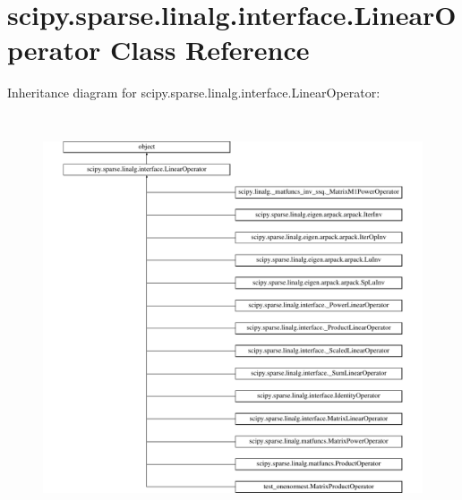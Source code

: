\hypertarget{classscipy_1_1sparse_1_1linalg_1_1interface_1_1LinearOperator}{}\section{scipy.\+sparse.\+linalg.\+interface.\+Linear\+Operator Class Reference}
\label{classscipy_1_1sparse_1_1linalg_1_1interface_1_1LinearOperator}
Inheritance diagram for scipy.\+sparse.\+linalg.\+interface.\+Linear\+Operator\+:\begin{figure}[H]
\begin{center}
\leavevmode
\includegraphics[height=12.000000cm]{classscipy_1_1sparse_1_1linalg_1_1interface_1_1LinearOperator}
\end{center}
\end{figure}
